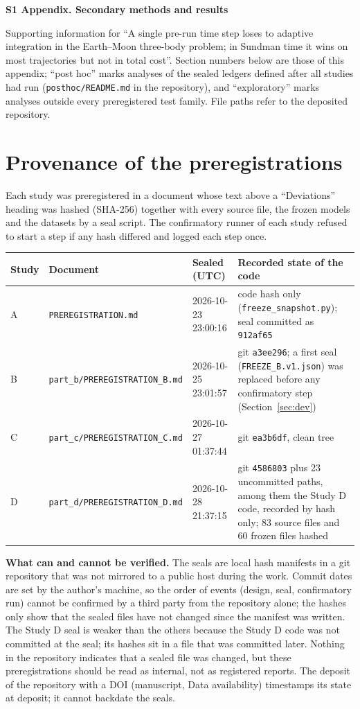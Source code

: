 \documentclass[10pt,letterpaper]{article}
\begin{document}
{\Large\textbf{S1 Appendix. Secondary methods and results}}

\smallskip
Supporting information for ``A single pre-run time step loses to adaptive integration in the Earth--Moon three-body problem; in Sundman time it
wins on most trajectories but not in total cost''. Section numbers below are those of this appendix; ``post hoc'' marks analyses of the sealed
ledgers defined after all studies had run (\texttt{posthoc/README.md} in the repository), and ``exploratory'' marks analyses outside every
preregistered test family. File paths refer to the deposited repository.

\tableofcontents

\section{Provenance of the preregistrations}
Each study was preregistered in a document whose text above a ``Deviations'' heading was hashed (SHA-256) together with every source file, the
frozen models and the datasets by a seal script. The confirmatory runner of each study refused to start a step if any hash differed and logged
each step once.

{\small
\begin{tabular}{|l|L{1.75in}|L{0.95in}|L{2.6in}|}
\hline
\textbf{Study} & \textbf{Document} & \textbf{Sealed (UTC)} & \textbf{Recorded state of the code} \\ \hline
A & \texttt{PREREGISTRATION.md} & 2026-10-23 23:00:16 & code hash only (\texttt{freeze\_snapshot.py}); seal committed as \texttt{912af65} \\ \hline
B & \texttt{part\_b/PREREGISTRATION\_B.md} & 2026-10-25 23:01:57 & git \texttt{a3ee296}; a first seal (\texttt{FREEZE\_B.v1.json}) was replaced before any confirmatory step (Section~\ref{sec:dev}) \\ \hline
C & \texttt{part\_c/PREREGISTRATION\_C.md} & 2026-10-27 01:37:44 & git \texttt{ea3b6df}, clean tree \\ \hline
D & \texttt{part\_d/PREREGISTRATION\_D.md} & 2026-10-28 21:37:15 & git \texttt{4586803} plus 23 uncommitted paths, among them the Study D code, recorded by hash only; 83 source files and 60 frozen files hashed \\ \hline
\end{tabular}}

\textbf{What can and cannot be verified.} The seals are local hash manifests in a git repository that was not mirrored to a public host during
the work. Commit dates are set by the author's machine, so the order of events (design, seal, confirmatory run) cannot be confirmed by a third
party from the repository alone; the hashes only show that the sealed files have not changed since the manifest was written. The Study D seal is
weaker than the others because the Study D code was not committed at the seal; its hashes sit in a file that was committed later. Nothing in
the repository indicates that a sealed file was changed, but these preregistrations should be read as internal, not as registered reports.
The deposit of the repository with a DOI (manuscript, Data availability) timestamps its state at deposit; it cannot backdate the seals.
\end{document}
